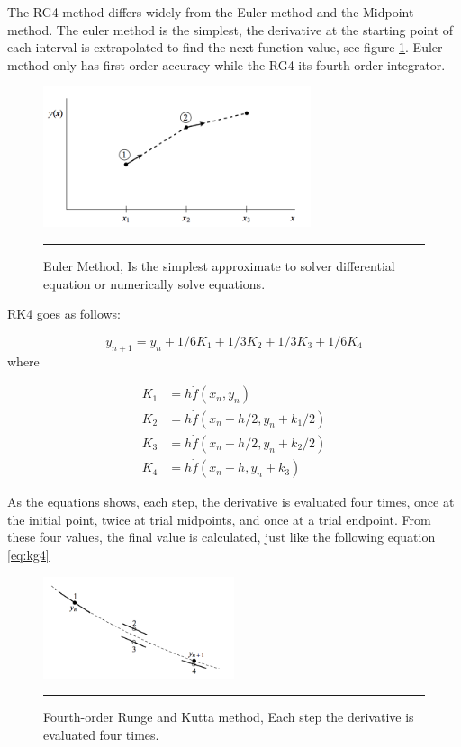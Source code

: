 The RG4 method differs widely from the Euler method and the Midpoint method. The euler method is the simplest, the derivative at the starting point of each interval is extrapolated to find the next function value, see figure \ref{fig:euler}. Euler method only has first order accuracy while the RG4 its fourth order integrator.

\begin{figure}[htbp]
	\centering
		\includegraphics[width=0.7\textwidth]{Figures/euler.png}
		\rule{35em}{0.5pt}
	\caption[Euler Method]{Euler Method, Is the simplest approximate to solver differential equation or numerically solve equations.}
	\label{fig:euler}
\end{figure}

RK4 goes as follows:

\begin{equation} \label{eq:kg4}
y_{n+1} = y_{n} + 1/6 K_{1} + 1/3 K_{2} +1/3 K_{3} + 1/6 K_{4}
\end{equation}
where

\begin{align*}
K_{1} &= h \dot f(x_{n}, y_{n}) \\
K_{2} &= h \dot f(x_{n} + h/2, y_{n} + k_{1}/2) \\
K_{3} &= h \dot f(x_{n} + h/2, y_{n} + k_{2}/2) \\
K_{4} &= h \dot f(x_{n} + h, y_{n} + k_{3})
\end{align*}

As the equations shows, each step, the derivative is evaluated four times, once at the initial point, twice at trial midpoints, and once at a trial endpoint. From these four values, the final value is calculated, just like the following equation \ref{eq:kg4}

\begin{figure}[htbp]
	\centering
		\includegraphics[width=0.5\textwidth]{Figures/rk4.png}
		\rule{35em}{0.5pt}
	\caption[Fourth-order Runge and Kutta Method]{Fourth-order Runge and Kutta method, Each step the derivative is evaluated four times. }
	\label{fig:kutta}
\end{figure}


